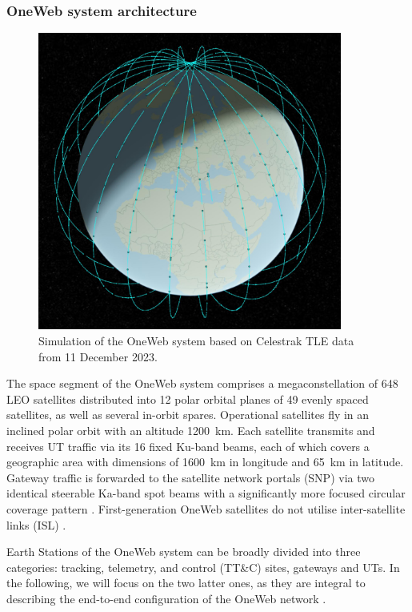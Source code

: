 \documentclass[english, 12pt, a4paper, elec, utf8, a-1b, online]{aaltothesis}
\begin{document}
\subsubsection{OneWeb system architecture} \label{ch-oneweb}

\begin{figure}[h]
  \centering
  \includegraphics[width=100mm]{figures/oneweb-tle-2023-12-11-compressed.jpg}
  \caption{Simulation of the OneWeb system based on Celestrak TLE data from 11 December 2023.}
  \label{fig-oneweb-tle-2023-12-11}
\end{figure}

The space segment of the OneWeb system comprises a megaconstellation of 648 LEO satellites distributed into 12 polar orbital planes of 49 evenly spaced satellites, as well as several in-orbit spares. 
Operational satellites fly in an inclined polar orbit with an altitude \SI{1200}{\kilo\meter}.
Each satellite transmits and receives UT traffic via its 16 fixed Ku-band beams, each of which covers a geographic area with dimensions of \SI{1600}{\kilo\meter} in longitude and \SI{65}{\kilo\meter} in latitude.
Gateway traffic is forwarded to the satellite network portals (SNP) via two identical steerable Ka-band spot beams with a significantly more focused circular coverage pattern \cite{henri2020oneweb, worldvu2016loi}. First-generation OneWeb satellites do not utilise inter-satellite links (ISL) \cite{portillo2019technical}.

Earth Stations of the OneWeb system can be broadly divided into three categories: tracking, telemetry, and control (TT\&C) sites, gateways and UTs.
In the following, we will focus on the two latter ones, as they are integral to describing the end-to-end configuration of the OneWeb network \cite{worldvu2016loi}.
\end{document}
